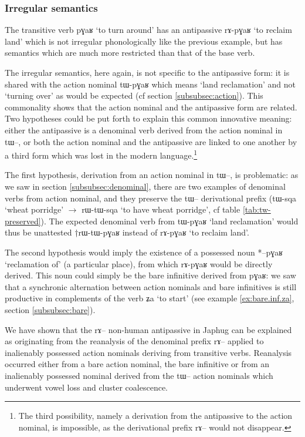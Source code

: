 \documentclass[oldfontcommands,oneside,a4paper,11pt]{article}
\newcommand{\ipa}[1]{{\phon \mbox{#1}}} %
\begin{document}
\subsubsection{Irregular semantics} \label{subsec:sem.irr}
The transitive verb \ipa{pɣaʁ} `to turn around' has an antipassive \ipa{rɤ-pɣaʁ} `to reclaim land' which is not irregular phonologically like the previous example, but has semantics   which are much more restricted than that of the base verb. 

The irregular semantics, here again, is not specific to the antipassive form: it is shared with the action nominal \ipa{tɯ-pɣaʁ} which means `land reclamation' and not `turning over' as would be expected (cf section \ref{subsubsec:action}). This commonality shows that the action nominal and the antipassive form are related. Two hypotheses could be put forth to explain this common innovative meaning: either the antipassive is a denominal verb derived from the action nominal in \ipa{tɯ}--, or both the action nominal and the antipassive are linked to one another by a third form which   was lost in the modern language.\footnote{The third possibility, namely a derivation from the antipassive to the action nominal, is impossible, as the derivational prefix \ipa{rɤ}-- would not disappear.} 

The first hypothesis, derivation from an action nominal in \ipa{tɯ}--, is problematic: as we saw in section \ref{subsubsec:denominal}, there are two examples of denominal verbs from action nominal, and they preserve the \ipa{tɯ}-- derivational prefix (\ipa{tɯ-sqa} `wheat porridge' $\rightarrow$ \ipa{rɯ-tɯ-sqa} `to have wheat porridge', cf table \ref{tab:tw-preserved}). The expected denominal verb from \ipa{tɯ-pɣaʁ} `land reclamation' would thus be unattested †\ipa{rɯ-tɯ-pɣaʁ} instead of \ipa{rɤ-pɣaʁ} `to reclaim land'.


The second hypothesis would imply the existence of a possessed noun *\ipa{--pɣaʁ} `reclamation of' (a particular place), from which \ipa{rɤ-pɣaʁ} would be directly derived. This noun could simply be the bare infinitive derived from \ipa{pɣaʁ}: we saw that a synchronic alternation between action nominals and bare infinitives is still   productive in complements of the verb \ipa{ʑa} `to start' (see example \ref{ex:bare.inf.za}, section \ref{subsubsec:bare}).


 
We have shown that the \ipa{rɤ}-- non-human antipassive in Japhug can be explained as originating from the reanalysis of the denominal prefix \ipa{rɤ}-- applied to inalienably possessed action nominals deriving from transitive verbs. Reanalysis occurred either from a bare action nominal, the bare infinitive or from an inalienably possessed nominal derived from the \ipa{tɯ}-- action nominals which underwent vowel loss and cluster coalescence. 
\end{document}

